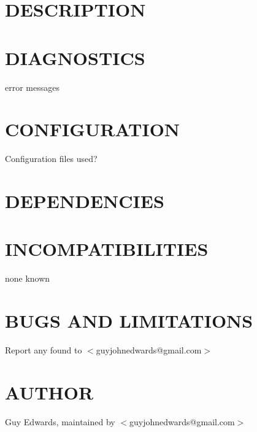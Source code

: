 \documentclass{book}
\begin{document}
\section{DESCRIPTION}
\label{_DESCRIPTION}
\hypertarget{_DESCRIPTION}{}


\section{DIAGNOSTICS}
\label{_DIAGNOSTICS}
\hypertarget{_DIAGNOSTICS}{}



error messages


\section{CONFIGURATION}
\label{_CONFIGURATION}
\hypertarget{_CONFIGURATION}{}



Configuration files used?


\section{DEPENDENCIES}
\label{_DEPENDENCIES}
\hypertarget{_DEPENDENCIES}{}


\section{INCOMPATIBILITIES}
\label{_INCOMPATIBILITIES}
\hypertarget{_INCOMPATIBILITIES}{}



none known


\section{BUGS AND LIMITATIONS}
\label{_BUGS_AND_LIMITATIONS}
\hypertarget{_BUGS_AND_LIMITATIONS}{}



Report any found to $<$guyjohnedwards@gmail.com$>$


\section{AUTHOR}
\label{_AUTHOR}
\hypertarget{_AUTHOR}{}



Guy Edwards, maintained by $<$guyjohnedwards@gmail.com$>$
\end{document}
